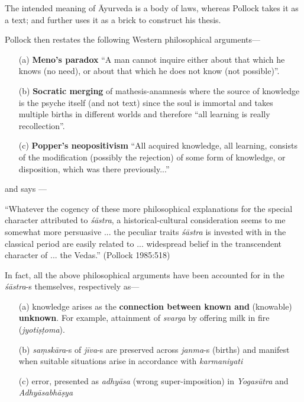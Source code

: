 The intended meaning of Āyurveda is a body of laws, whereas Pollock takes it as a text; and further uses it as a brick to construct his thesis. 

Pollock then restates the following Western philosophical arguments---
\begin{itemize}
\item[(a)] {\bf Meno's paradox}  ``A man cannot inquire either about that which he knows (no need), or about that which he does not know (not possible)''.

\item[(b)] {\bf Socratic merging} of mathesis-anamnesis where the source of knowledge is the psyche itself (and not text) since the soul is immortal and takes multiple births in different worlds and therefore ``all learning is really recollection''.

\item[(c)] {\bf Popper's neopositivism} ``All acquired knowledge, all learning, consists of the modiﬁcation (possibly the rejection) of some form of knowledge, or disposition, which was there previously...''
\end{itemize}
and says ---
\begin{myquote}
``Whatever the cogency of these more philosophical explanations for the special character attributed to {\sl śāstra}, a historical-cultural consideration seems to me somewhat more persuasive ... the peculiar traits {\sl śāstra} is invested with in the classical period are easily related to ... widespread belief in the transcendent character of ... the Vedas.'' (Pollock 1985:518)
\end{myquote}

In fact, all the above philosophical arguments have been accounted for in the {\sl śāstra}-s themselves, respectively as---
\begin{itemize}
\item[(a)] knowledge arises as the {\bf connection between known and} (knowable) {\bf unknown}. For example, attainment of {\sl svarga} by offering milk in ﬁre ({\sl jyotiṣṭoma}).

\item[(b)] {\sl saṃskāra}-s of {\sl jīva}-s are preserved across {\sl janma}-s (births) and manifest when suitable situations arise in accordance with {\sl karmaniyati}

\item[(c)] error, presented as {\sl adhyāsa} (wrong super-imposition) in {\sl Yogasūtra} and {\sl Adhyāsabhāṣya}
\end{itemize}

